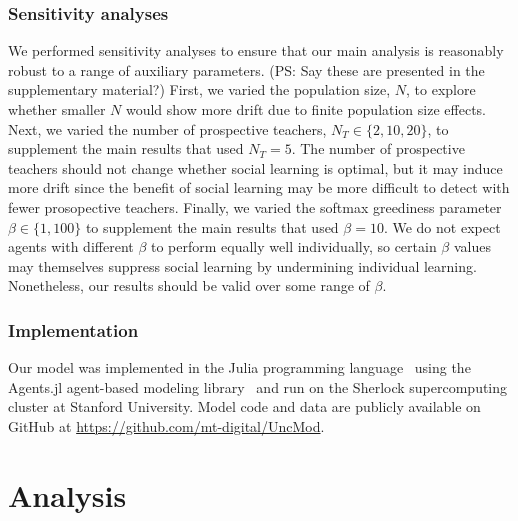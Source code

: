 \documentclass[letterpaper,11.5pt]{scrartcl}
\newcommand{\ps}[1]{{\textcolor{mygreen} {({\tiny PS:} #1)}}}
\begin{document}
\subsubsection{Sensitivity analyses}

We performed sensitivity analyses to ensure that our main analysis is reasonably
robust to a range of auxiliary parameters. \ps{Say these are presented in the supplementary material?} First, we varied the population size, $N$, to explore whether smaller $N$ would show more drift due to finite population size effects. %
Next, we varied the number of prospective teachers, $N_T \in \{2, 10, 20\}$, to supplement the main results that used $N_T = 5$. The number of prospective
teachers should not change whether social learning is optimal, but it may induce more drift since the benefit of social learning may
be more difficult to detect with fewer prosopective teachers. Finally, we varied the
softmax greediness parameter $\beta \in \{1, 100\}$ to supplement the main results
that used $\beta = 10$. We do not
expect agents with different $\beta$ to perform equally well 
individually, so certain $\beta$ values may themselves suppress social learning
by undermining individual learning. Nonetheless, our results
should be valid over some range of $\beta$. 


\subsubsection{Implementation}

Our model was implemented in the Julia programming language~\cite{Bezanson2017} 
using the Agents.jl agent-based modeling library~\cite{Datseris2022} and run
on the Sherlock supercomputing cluster at Stanford University. Model code and
data are publicly available on GitHub at \url{https://github.com/mt-digital/UncMod}.


\section{Analysis}
\end{document}

